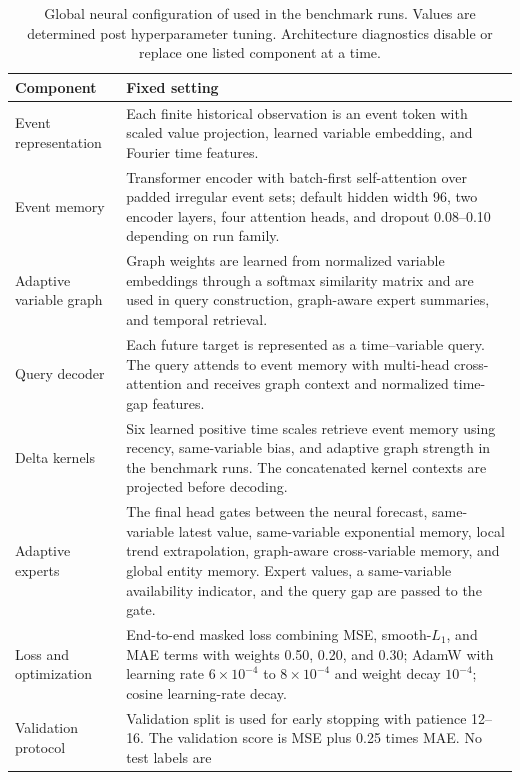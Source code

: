 \documentclass[preprint,12pt]{elsarticle}
\begin{document}
\begin{table}[!htbp]
\caption{Global neural configuration of \method{} used in the benchmark runs. Values are determined post hyperparameter tuning. Architecture diagnostics disable or replace one listed component at a time.}
\label{tab:adept-fixed-config}
\centering
\scriptsize
\begin{tabular}{p{}p{}}
\toprule
Component & Fixed setting \\
\midrule
Event representation & Each finite historical observation is an event token with
scaled value projection, learned variable embedding, and Fourier time features. \\
\addlinespace
Event memory & Transformer encoder with batch-first self-attention over padded
irregular event sets; default hidden width 96, two encoder layers, four
attention heads, and dropout 0.08--0.10 depending on run family. \\
\addlinespace
Adaptive variable graph & Graph weights are learned from normalized variable
embeddings through a softmax similarity matrix and are used in query
construction, graph-aware expert summaries, and temporal retrieval. \\
\addlinespace
Query decoder & Each future target is represented as a time--variable query.
The query attends to event memory with multi-head cross-attention and receives
graph context and normalized time-gap features. \\
\addlinespace
Delta kernels & Six learned positive time scales retrieve event memory using
recency, same-variable bias, and adaptive graph strength in the \method{} benchmark
runs. The concatenated kernel contexts are projected before decoding. \\
\addlinespace
Adaptive experts & The final head gates between the neural forecast, same-variable
latest value, same-variable exponential memory, local trend extrapolation,
graph-aware cross-variable memory, and global entity memory. Expert
values, a same-variable availability indicator, and the query gap are passed to
the gate. \\
\addlinespace
Loss and optimization & End-to-end masked loss combining MSE, smooth-$L_1$, and
MAE terms with weights 0.50, 0.20, and 0.30; AdamW with learning rate
$6\times10^{-4}$ to $8\times10^{-4}$ and weight decay $10^{-4}$; cosine
learning-rate decay. \\
\addlinespace
Validation protocol & Validation split is used for early stopping with patience
12--16. The \method{} validation score is MSE plus 0.25 times MAE. No test labels are

\end{tabular}
\end{table}
\end{document}
